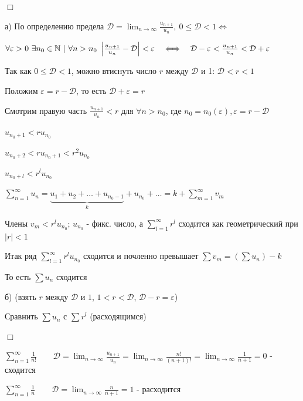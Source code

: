 \documentclass[12pt]{article}
\begin{document}
    \begin{MyProof}
        $\Box$

        а) По определению предела $\mathcal{D} = \lim_{n \to \infty} \frac{u_{n + 1}}{u_n}, \ 0 \leq \mathcal{D} < 1 \Longleftrightarrow$

        $\forall \varepsilon > 0 \ \exists n_0 \in \mathbb{N} \ | \ \forall n > n_0 \ \left|\frac{u_{n + 1}}{u_n} - \mathcal{D}\right| < \varepsilon \quad \Longleftrightarrow \quad \mathcal{D} - \varepsilon < \frac{u_{n + 1}}{u_n} < \mathcal{D} + \varepsilon$

        Так как $0 \leq \mathcal{D} < 1$, можно втиснуть число $r$ между $\mathcal{D}$ и 1: $\mathcal{D} < r < 1$

        Положим $\varepsilon = r - \mathcal{D}$, то есть $\mathcal{D} + \varepsilon = r$

        Смотрим правую часть $\frac{u_{n + 1}}{u_n} < r$ для $\forall n > n_0$, где $n_0 = n_0(\varepsilon), \varepsilon = r - \mathcal{D}$

        $u_{n_0 + 1} < r u_{n_0}$

        $u_{n_0 + 2} < r u_{n_0 + 1} < r^2 u_{n_0}$

        $u_{n_0 + l} < r^l u_{n_0}$

        $\sum_{n = 1}^\infty u_n = \underset{k}{\underbrace{u_1 + u_2 + \dots + u_{n_0 - 1}}} + u_{n_0} + \dots = k + \sum_{m = 1}^\infty v_m $ %

        Члены $v_m < r^l u_{n_0}$; $u_{n_0}$ - фикс. число, а $\sum_{l = 1}^\infty r^l$ сходится как геометрический при $|r| < 1$

        Итак ряд $\sum_{l = 1}^\infty r^l u_{n_0}$ сходится и почленно превышает $\sum v_m = \left(\sum u_n\right) - k$

        То есть $\sum u_n$ сходится

        б) \Lab (взять $r$ между $\mathcal{D}$ и $1$, $1 < r < \mathcal{D}$, $\mathcal{D} - r = \varepsilon$)

        Сравнить $\sum u_n$ с $\sum r^l$ (расходящимся)

        $\Box$
    \end{MyProof}

     $\sum_{n = 1}^\infty \frac{1}{n!} \quad\quad \mathcal{D} = \lim_{n \to \infty} \frac{u_{n + 1}}{u_n} = \lim_{n \to \infty} \frac{n!}{(n + 1)!} = \lim_{n \to \infty} \frac{1}{n + 1} = 0$ - сходится

     $\sum_{n = 1}^\infty \frac{1}{n} \quad\quad \mathcal{D} = \lim_{n \to \infty} \frac{n}{n + 1} = 1$ - расходится
\end{document}
